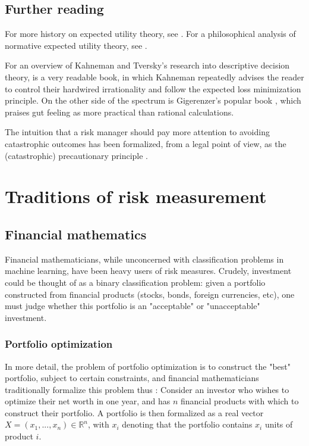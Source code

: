 \subsection{Further reading}

For more history on expected utility theory, see \cite{fishburnRetrospectiveUtilityTheory1989}. For a philosophical analysis of normative expected utility theory, see \cite{briggsNormativeTheoriesRational2019}. 

For an overview of Kahneman and Tversky's research into descriptive decision theory, \cite{kahnemanThinkingFastSlow2011} is a very readable book, in which Kahneman repeatedly advises the reader to control their hardwired irrationality and follow the expected loss minimization principle. On the other side of the spectrum is Gigerenzer's popular book \cite{gigerenzerGutFeelingsIntelligence2007}, which praises gut feeling as more practical than rational calculations.

The intuition that a risk manager should pay more attention to avoiding catastrophic outcomes has been formalized, from a legal point of view, as the (catastrophic) precautionary principle \cite{sunsteinCatastrophicHarmPrecautionary2007}.

\section{Traditions of risk measurement}

\subsection{Financial mathematics}
Financial mathematicians, while unconcerned with classification problems in machine learning, have been heavy users of risk measures. Crudely, investment could be thought of as a binary classification problem: given a portfolio constructed from financial products (stocks, bonds, foreign currencies, etc), one must judge whether this portfolio is an "acceptable" or "unacceptable" investment.

\subsubsection{Portfolio optimization}
In more detail, the problem of portfolio optimization is to construct the "best" portfolio, subject to certain constraints, and financial mathematicians traditionally formalize this problem thus \cite[section 3]{ahmadi-javidPortfolioOptimizationEntropic2019}: Consider an investor who wishes to optimize their net worth in one year, and has $n$ financial products with which to construct their portfolio. A portfolio is then formalized as a real vector $X = (x_1, ..., x_n)\in\mathbb{R}^n$, with $x_i$ denoting that the portfolio contains $x_i$ units of product $i$.

